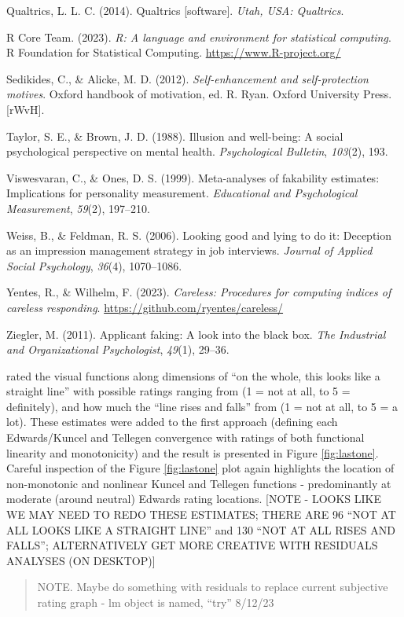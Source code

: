 \documentclass[
  ,jou]{apa6}
\newlength{\cslhangindent}
\newlength{\cslentryspacingunit} %
\newenvironment{CSLReferences}[2] %
 {%
  \setlength{\parindent}{0pt}
  \ifodd #1
  \let\oldpar\par
  \def\par{\hangindent=\cslhangindent\oldpar}
  \fi
  \setlength{\parskip}{#2\cslentryspacingunit}
 }%
 {}
\begin{document}
\begin{CSLReferences}{1}{0}
\leavevmode{}%
Qualtrics, L. L. C. (2014). Qualtrics {[}software{]}. \emph{Utah, {USA}: Qualtrics}.

\leavevmode{}%
R Core Team. (2023). \emph{R: A language and environment for statistical computing}. R Foundation for Statistical Computing. \url{https://www.R-project.org/}

\leavevmode{}%
Sedikides, C., \& Alicke, M. D. (2012). \emph{Self-enhancement and self-protection motives}. Oxford handbook of motivation, ed. R. Ryan. Oxford University Press.{[}{rWvH}{]}.

\leavevmode{}%
Taylor, S. E., \& Brown, J. D. (1988). Illusion and well-being: A social psychological perspective on mental health. \emph{Psychological Bulletin}, \emph{103}(2), 193.

\leavevmode{}%
Viswesvaran, C., \& Ones, D. S. (1999). Meta-analyses of fakability estimates: Implications for personality measurement. \emph{Educational and Psychological Measurement}, \emph{59}(2), 197--210.

\leavevmode{}%
Weiss, B., \& Feldman, R. S. (2006). Looking good and lying to do it: Deception as an impression management strategy in job interviews. \emph{Journal of Applied Social Psychology}, \emph{36}(4), 1070--1086.

\leavevmode{}%
Yentes, R., \& Wilhelm, F. (2023). \emph{Careless: Procedures for computing indices of careless responding}. \url{https://github.com/ryentes/careless/}

\leavevmode{}%
Ziegler, M. (2011). Applicant faking: A look into the black box. \emph{The Industrial and Organizational Psychologist}, \emph{49}(1), 29--36.

\end{CSLReferences}

\endgroup

rated the visual functions along dimensions of ``on the whole, this looks like a straight line'' with possible ratings ranging from (1 = not at all, to 5 = definitely), and how much the ``line rises and falls'' from (1 = not at all, to 5 = a lot). These estimates were added to the first approach (defining each Edwards/Kuncel and Tellegen convergence with ratings of both functional linearity and monotonicity) and the result is presented in Figure \ref{fig:lastone}. Careful inspection of the Figure \ref{fig:lastone} plot again highlights the location of non-monotonic and nonlinear Kuncel and Tellegen functions - predominantly at moderate (around neutral) Edwards rating locations. {[}NOTE - LOOKS LIKE WE MAY NEED TO REDO THESE ESTIMATES; THERE ARE 96 ``NOT AT ALL LOOKS LIKE A STRAIGHT LINE'' and 130 ``NOT AT ALL RISES AND FALLS''; ALTERNATIVELY GET MORE CREATIVE WITH RESIDUALS ANALYSES (ON DESKTOP){]}

\begin{quote}
NOTE. Maybe do something with residuals to replace current subjective rating graph - lm object is named, ``try'' 8/12/23
\end{quote}
\end{document}

